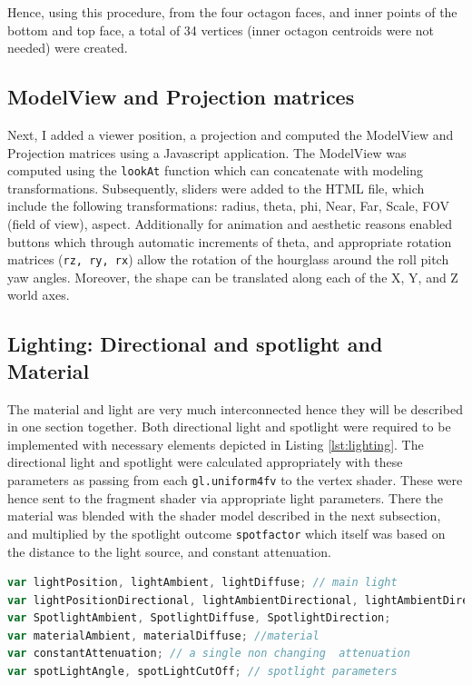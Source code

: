 \documentclass[12pt,a4paper]{article}
\begin{document}
Hence, using this procedure, from the four octagon faces, and inner points of the bottom and top face, a total of 34 vertices  (inner octagon centroids were not needed) were created. 

\subsection{ModelView and Projection matrices}

Next, I added a viewer position, a projection and computed the ModelView and Projection matrices using a Javascript application. The ModelView was computed using the \texttt{lookAt} function which can concatenate with modeling transformations. Subsequently, sliders were added to the HTML file, which include the following transformations: radius, theta, phi, Near, Far, Scale, FOV (field of view), aspect. Additionally for animation and aesthetic reasons enabled buttons which through automatic increments of theta, and appropriate rotation matrices (\texttt{rz, ry, rx}) allow the rotation of the hourglass around the roll pitch yaw angles. Moreover, the shape can be translated along each of the X, Y, and Z world axes.

\subsection{Lighting: Directional and spotlight and Material}
The material and light are very much interconnected hence they will be described in one section together.
Both directional light and spotlight were required to be implemented with necessary elements depicted in Listing \ref{lst:lighting}. The directional light and spotlight were calculated appropriately  with these parameters as passing from each \texttt{gl.uniform4fv}  to the vertex shader. These were hence sent to the fragment shader via appropriate light parameters. There the material was blended with the shader model described in the next subsection, and multiplied by the spotlight outcome \texttt{spotfactor} which itself was based on the distance to the light source, and constant attenuation.

\begin{lstlisting}[caption={Light and Material parameters},label={lst:lighting},language=JavaScript]
var lightPosition, lightAmbient, lightDiffuse; // main light
var lightPositionDirectional, lightAmbientDirectional, lightAmbientDirectional;
var SpotlightAmbient, SpotlightDiffuse, SpotlightDirection;
var materialAmbient, materialDiffuse; //material
var constantAttenuation; // a single non changing  attenuation
var spotLightAngle, spotLightCutOff; // spotlight parameters
\end{lstlisting}
\end{document}
